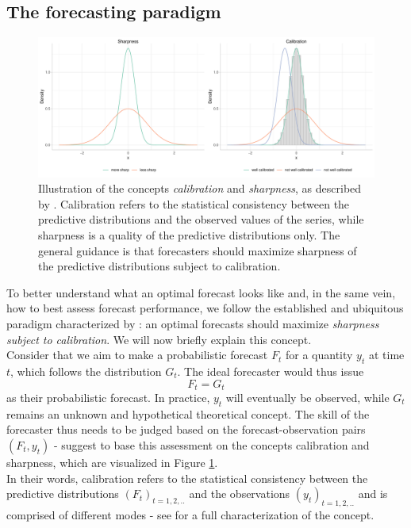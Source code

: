 \subsection{The forecasting paradigm}
\begin{figure}
\centering
\includegraphics[width = \textwidth]{../plots/sharp_calib.pdf}
\caption{Illustration of the concepts \textit{calibration} and \textit{sharpness}, as described by \cite{gneiting_probabilistic_2007}. Calibration refers to the statistical consistency between the predictive distributions and the observed values of the series, while sharpness is a quality of the predictive distributions only. The general guidance is that forecasters should maximize sharpness of the predictive distributions subject to calibration.}
\label{fig:sharpcalib}
\end{figure}
To better understand what an optimal forecast looks like and, in the same vein, how to best assess forecast performance, we follow the established and ubiquitous paradigm characterized by \cite{gneiting_probabilistic_2007}: an optimal forecasts should maximize \textit{sharpness subject to calibration}. We will now briefly explain this concept.\\
Consider that we aim to make a probabilistic forecast $F_t$ for a quantity $y_t$ at time $t$, which follows the distribution $G_t$. The ideal forecaster would thus issue 
\begin{equation*}
	F_t = G_t
\end{equation*}
as their probabilistic forecast. In practice, $y_t$ will eventually be observed, while $G_t$ remains an unknown and hypothetical theoretical concept. The skill of the forecaster thus needs to be judged based on the forecast-observation pairs $(F_t, y_t)$ - \cite{gneiting_probabilistic_2007} suggest to base this assessment on the concepts calibration and sharpness, which are visualized in Figure \ref{fig:sharpcalib}. \\
In their words, calibration refers to the statistical consistency between the predictive distributions $(F_t)_{t = 1,2,..}$ and the observations $(y_t)_{t = 1,2,..}$ and is comprised of different modes - see \cite{gneiting_probabilistic_2007} for a full characterization of the concept.   %
